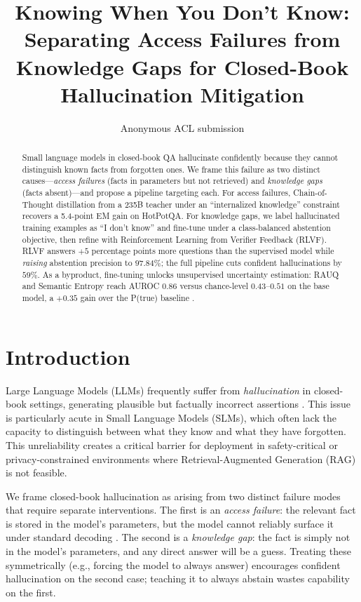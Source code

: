 \documentclass[11pt]{article}
\title{Knowing When You Don't Know:\\Separating Access Failures from Knowledge Gaps for Closed-Book Hallucination Mitigation}
\author{Anonymous ACL submission}
\begin{document}
\maketitle

\begin{abstract}
Small language models in closed-book QA hallucinate confidently because they cannot distinguish known facts from forgotten ones. We frame this failure as two distinct causes---\emph{access failures} (facts in parameters but not retrieved) and \emph{knowledge gaps} (facts absent)---and propose a pipeline targeting each. For access failures, Chain-of-Thought distillation from a 235B teacher under an ``internalized knowledge'' constraint recovers a 5.4-point EM gain on HotPotQA. For knowledge gaps, we label hallucinated training examples as ``I don't know'' and fine-tune under a class-balanced abstention objective, then refine with Reinforcement Learning from Verifier Feedback (RLVF). RLVF answers $+5$ percentage points more questions than the supervised model while \emph{raising} abstention precision to $97.84\%$; the full pipeline cuts confident hallucinations by $59\%$. As a byproduct, fine-tuning unlocks unsupervised uncertainty estimation: RAUQ and Semantic Entropy reach AUROC $0.86$ versus chance-level $0.43$--$0.51$ on the base model, a $+0.35$ gain over the P(true) baseline \citep{kadavath2022language}.
\end{abstract}

\section{Introduction}
Large Language Models (LLMs) frequently suffer from \emph{hallucination} in closed-book settings, generating plausible but factually incorrect assertions \cite{ji2023survey}. This issue is particularly acute in Small Language Models (SLMs), which often lack the capacity to distinguish between what they know and what they have forgotten. This unreliability creates a critical barrier for deployment in safety-critical or privacy-constrained environments where Retrieval-Augmented Generation (RAG) is not feasible.

We frame closed-book hallucination as arising from two distinct failure modes that require separate interventions. The first is an \emph{access failure}: the relevant fact is stored in the model's parameters, but the model cannot reliably surface it under standard decoding \cite{kadavath2022language}. The second is a \emph{knowledge gap}: the fact is simply not in the model's parameters, and any direct answer will be a guess. Treating these symmetrically (e.g., forcing the model to always answer) encourages confident hallucination on the second case; teaching it to always abstain wastes capability on the first.
\end{document}
